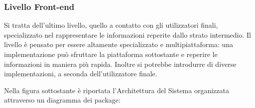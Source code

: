 \documentclass[a4paper]{article}
\begin{document}
\subsubsection{Livello Front-end}
Si tratta dell'ultimo livello, quello a contatto con gli utilizzatori finali, specializzato nel rappresentare le informazioni reperite dallo strato intermedio. Il livello è pensato per essere altamente specializzato e multipiattaforma: una implementazione può sfruttare la piattaforma sottostante e reperire le informazioni in maniera più rapida. Inoltre si potrebbe introdurre di diverse implementazioni, a seconda dell'utilizzatore finale.



Nella figura sottostante è riportata l’Architettura del Sistema organizzata attraverso un
diagramma dei package:\\
\end{document}

